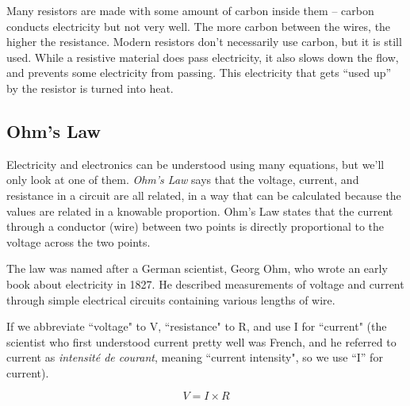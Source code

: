 Many resistors are made with some amount of carbon inside them -- carbon conducts electricity but not very well. The more carbon between the wires, the higher the resistance. Modern resistors don't necessarily use carbon, but it is still used. While a resistive material does pass electricity, it also slows down the flow, and prevents some electricity from passing. This electricity that gets ``used up'' by the resistor is turned into heat. 


\subsection*{Ohm's Law}

Electricity and electronics can be understood using many equations, but we'll only look at one of them. \emph{Ohm's Law} says that the voltage, current, and resistance in a circuit are all related, in a way that can be calculated because the values are related in a knowable proportion. Ohm's Law states that the current through a conductor (wire) between two points is directly proportional to the voltage across the two points.

The law was named after a German scientist, Georg Ohm, who wrote an early book about electricity in  1827. He described measurements of voltage and current through simple electrical circuits containing various lengths of wire.

If we abbreviate ``voltage" to V, ``resistance" to R, and use I for ``current" (the scientist who first understood current pretty well was French, and he referred to current as \emph{intensit{\'e} de courant}, meaning ``current intensity", so we use ``I'' for current). 

\begin{equation}
V = I \times R
\end{equation}


